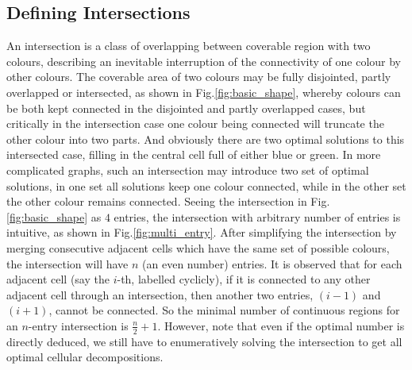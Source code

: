 \documentclass[conference]{IEEEtran}
\begin{document}
\subsection{Defining Intersections}
An intersection is a class of overlapping between coverable region with two colours, describing an inevitable interruption of the connectivity of one colour 
by other colours. 
The coverable area of two colours may be fully disjointed, partly overlapped or intersected, as shown in Fig.\ref{fig:basic_shape}, 
whereby colours can be both kept connected in the disjointed and partly overlapped cases, but critically in the intersection case one colour being connected will truncate the other colour into two parts. 
And obviously there are two optimal solutions to this intersected case, filling in the central cell full of either blue or green.
In more complicated graphs, such an intersection may introduce two set of optimal solutions, in one set all solutions keep one colour connected, 
while in the other set the other colour remains connected. Seeing the intersection in Fig.\ref{fig:basic_shape} as $4$ entries, the intersection with arbitrary number of entries is intuitive, as shown in Fig.\ref{fig:multi_entry}. After simplifying the intersection by merging consecutive adjacent cells which have the same set of possible colours, the intersection will have $n$ (an even number) entries. 
It is observed that for each adjacent cell (say the $i$-th, labelled cyclicly), if it is connected to any other adjacent cell through an intersection, then another two entries, $(i-1)$ and $(i+1)$, cannot be connected. So the minimal number of continuous regions for an $n$-entry intersection is $\frac{n}{2}+1$. 
However, note that even if the optimal number is directly deduced, we still have to enumeratively solving the intersection to get all optimal cellular decompositions. 

\end{document}

